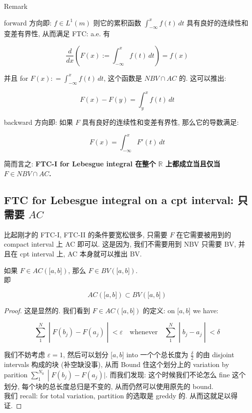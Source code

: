\begin{qlremark}{Remark}

forward 方向即: \(f \in L^{1}(m)\) 则它的累积函数 \(\int_{- \infty}^{x}f(t)\, dt\) 具有良好的连续性和变差有界性, 从而满足 FTC: a.e. 有

\[\frac{d}{dx}(F(x) := \int_{- \infty}^{x}f(t)\, dt) = f(x)\]

并且 for \(F(x): = \int_{- \infty}^{x}f(t)\, dt\), 这个函数是 \(NBV \cap AC\) 的. 这可以推出:

\[F(x) - F(y) = \int_{y}^{x}f(t)\, dt\]

backward 方向即: 如果 \(F\) 具有良好的连续性和变差有界性, 那么它的导数满足:

\[F(x) = \int_{- \infty}^{x}F'(t)\, dt\]

简而言之: \textbf{FTC-I for Lebesgue integral 在整个 \(\mathbb{R}\) 上都成立当且仅当 \(F \in NBV \cap AC\).}

\end{qlremark}

\subsection{\texorpdfstring{FTC for Lebesgue integral on a cpt interval: 只需要 \(AC\)}{FTC for Lebesgue integral on a cpt interval: 只需要 AC}}\label{ftc-for-lebesgue-integral-on-a-cpt-interval-ux53eaux9700ux8981-ac}

比起刚才的 FTC-I, FTC-II 的条件要宽松很多, 只需要 \(F\) 在它需要被用到的 compact interval 上 AC 即可以. 这是因为, 我们不需要用到 NBV 只需要 BV, 并且在 cpt interval 上, AC 本身就可以推出 BV.

\begin{lemma}

如果 \(F \in AC(\lbrack a,b\rbrack)\), 那么 \(F \in BV(\lbrack a,b\rbrack)\).\\
即

\[AC(\lbrack a,b\rbrack) \subset BV(\lbrack a,b\rbrack)\]

\end{lemma}

\begin{proof}

这是显然的. 我们看到 \(F \in AC(\lbrack a,b\rbrack)\) 的定义: on \(\lbrack a,b\rbrack\) we have:

\[\left. \sum\limits_{1}^{N} \middle| F(b_{j}) - F(a_{j}) \middle| < \varepsilon\quad\text{whenever}\quad\sum\limits_{1}^{N} \middle| b_{j} - a_{j} \middle| < \delta \right.\]

我们不妨考虑 \(\varepsilon = 1\), 然后可以划分 \(\lbrack a,b\rbrack\) into 一个个总长度为 \(\frac{\delta}{2}\) 的由 disjoint intervals 构成的块 (补空缺没事), 从而 Bound 住这个划分上的 variation by parition \(\left. \sum_{1}^{N_{0}} \middle| F(b_{j}) - F(a_{j})| \right.\). 而我们发现: 这个时候我们不论怎么 fine 这个划分, 每个块的总长度总归是不变的, 从而仍然可以使用原先的 bound.\\
我们 recall: for total variation, partition 的选取是 greddy 的. 从而这就足以得证.

\end{proof}

